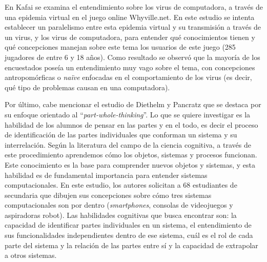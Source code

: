 En Kafai \cite{kafai} se examina el entendimiento sobre los virus de computadora,  a través de una epidemia virtual en el juego online Whyville.net. En este estudio se intenta establecer un paralelismo entre esta epidemia virtual y su transmisión a través de un virus, y los virus de computadora, para entender qué conocimientos tienen y qué concepciones manejan sobre este tema los usuarios de este juego (285 jugadores de entre 6 y 18 años). Como resultado se observó que la mayoría de los encuestados poseía un entendimiento muy vago sobre el tema, con concepciones antropomórficas o \textit{naïve} enfocadas en el comportamiento de los virus (es decir, qué tipo de problemas causan en una computadora). 

Por último, cabe mencionar el estudio de Diethelm y Pancratz \cite{pancratz} que se destaca por su enfoque orientado al ``\textit{part-whole-thinking}''. Lo que se quiere investigar es la habilidad de los alumnos de pensar en las partes y en el todo, es decir el proceso de identificación de las partes individuales que conforman un sistema y su interrelación. Según la literatura del campo de la ciencia cognitiva, a través de este procedimiento aprendemos cómo los objetos, sistemas y procesos funcionan. Este conocimiento es la base para comprender nuevos objetos y sistemas, y esta habilidad es de fundamental importancia para entender sistemas computacionales. En este estudio, los autores solicitan a 68 estudiantes de secundaria que dibujen sus concepciones sobre cómo tres sistemas computacionales son por dentro (\textit{smartphones}, consolas de videojuegos y aspiradoras robot). Las habilidades cognitivas que busca encontrar son: la capacidad de identificar partes individuales en un sistema, el entendimiento de sus funcionalidades independientes dentro de ese sistema, cuál es el rol de cada parte del sistema y la relación de las partes entre sí y la capacidad de extrapolar a otros sistemas.

